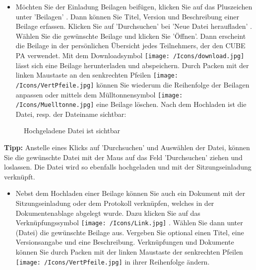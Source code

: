 \vspace{\baselineskip}

\begin{itemize}
\item 
Möchten Sie der Einladung Beilagen beifügen, klicken Sie auf das Pluszeichen unter 'Beilagen' . Dann können Sie Titel, Version und Beschreibung einer Beilage erfassen. Klicken Sie auf 'Durchsuchen' bei 'Neue Datei heraufladen' . Wählen Sie die gewünschte Beilage und klicken Sie 'Öffnen'. Dann erscheint die Beilage in der persönlichen Übersicht jedes Teilnehmers, der den CUBE PA verwendet. Mit dem Downloadsymbol \texttt{[image: /Icons/download.jpg]}  lässt sich eine Beilage herunterladen und abspeichern. Durch Packen mit der linken Maustaste an den senkrechten Pfeilen \texttt{[image: /Icons/VertPfeile.jpg]} können Sie wiederum die Reihenfolge der Beilagen anpassen oder mittels dem Mülltonnensymbol \texttt{[image: /Icons/Muelltonne.jpg]}  eine Beilage löschen. Nach dem Hochladen ist die Datei, resp. der Dateiname sichtbar:
\end{itemize}

\begin{figure}[H]
\caption{Hochgeladene Datei ist sichtbar}
\end{figure}

\textbf{Tipp:} Anstelle eines Klicks auf 'Durchsuchen' und Auswählen der Datei, können Sie die gewünschte Datei mit der Maus auf das Feld 'Durchsuchen' ziehen und loslassen. Die Datei wird so ebenfalls hochgeladen und mit der Sitzungseinladung verknüpft.

\vspace{\baselineskip}

\begin{itemize}
\item 
Nebst dem Hochladen einer Beilage können Sie auch ein Dokument mit der Sitzungseinladung oder dem Protokoll verknüpfen, welches in der Dokumentenablage abgelegt wurde. Dazu klicken Sie auf das Verknüpfungssymbol \texttt{[image: /Icons/Link.jpg]} . Wählen Sie dann unter  (Datei) die gewünschte Beilage aus. Vergeben Sie optional einen Titel, eine Versionsangabe und eine Beschreibung. Verknüpfungen und Dokumente können Sie durch Packen mit der linken Maustaste der senkrechten Pfeilen \texttt{[image: /Icons/VertPfeile.jpg]} in ihrer Reihenfolge ändern.
\end{itemize}

